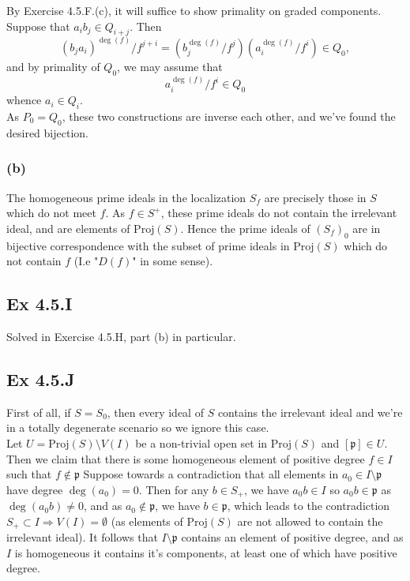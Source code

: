 \documentclass{article}
\theoremstyle{definition}
\newcommand{\Proj}{\text{Proj}}
\begin{document}
By Exercise 4.5.F.(c), it will suffice to show primality on graded components.
Suppose that $a_ib_j \in Q_{i + j}$. Then 
\[
	(b_j a_i)^{\deg(f)}/f^{j + i} 
	=
	\left(b_j^{\deg(f)}/f^j\right)
	\left(a_i^{\deg(f)}/f^i\right) 
	\in Q_0,
\]
and by primality of $Q_0$, we may assume that 
\[
	a_i^{\deg(f)}/f^i 
	\in Q_0
\] 
whence $a_i \in Q_i$. \\

As $P_0 = Q_0$, these two constructions are inverse each other, and we've found
the desired bijection.

\subsubsection*{(b)}

The homogeneous prime ideals in the localization $S_{f}$ are precisely those in
$S$ which do not meet $f$. As $f \in S^{+}$, these prime ideals do not contain
the irrelevant ideal, and are elements of $\Proj(S)$. Hence the prime ideals of
$(S_{f})_0$ are in bijective correspondence with the subset of prime ideals in
$\Proj(S)$ which do not contain $f$ (I.e "$D(f)$" in some sense).

\subsection*{Ex 4.5.I}

Solved in Exercise 4.5.H, part (b) in particular.

\subsection*{Ex 4.5.J}

First of all, if $S = S_0$, then every ideal of $S$ contains the irrelevant
ideal and we're in a totally degenerate scenario so we ignore this case. \\

Let $U = \Proj(S) \setminus V(I)$ be a non-trivial open set in $\Proj(S)$ and
$[\mathfrak{p}] \in U$. Then we claim that there is some homogeneous element of
positive degree $f \in I$ such that $f \not \in \mathfrak{p}$ Suppose towards a
contradiction that all elements in $a_0 \in I \setminus \mathfrak{p}$ have
degree $\deg(a_0) = 0$. Then for any $b \in S_{+}$, we have $a_0b \in I$ so
$a_0b \in \mathfrak{p}$ as $\deg(a_0b) \not = 0$, and as $a_0 \not \in
\mathfrak{p}$, we have $b \in \mathfrak{p}$, which leads to the contradiction
$S_{+} \subset I \Rightarrow V(I) = \emptyset$ (as elements of $\Proj(S)$ are
not allowed to contain the irrelevant ideal). It follows that $I \setminus
\mathfrak{p}$ contains an element of positive degree, and as $I$ is homogeneous
it contains it's components, at least one of which have positive degree. \\
\end{document}
